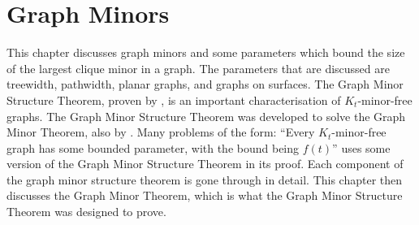 \chapter{Graph Minors}\label{chap:gmst}
This chapter discusses graph minors and some parameters which bound the size of the largest clique minor in a graph. The parameters that are discussed are treewidth, pathwidth, planar graphs, and graphs on surfaces. 
The Graph Minor Structure Theorem, proven by \textcite{robertsonGraphMinorsXVI2003}, is an important characterisation of $K_t$-minor-free graphs. The Graph Minor Structure Theorem was developed to solve the Graph Minor Theorem, also by \textcite{robertsonGraphMinorsXX2004}. Many problems of the form: ``Every $K_t$-minor-free graph has some bounded parameter, with the bound being $f(t)$'' uses some version of the Graph Minor Structure Theorem in its proof. 
Each component of the graph minor structure theorem is gone through in detail. This chapter then discusses the Graph Minor Theorem, which is what the Graph Minor Structure Theorem was designed to prove.














\newpage
